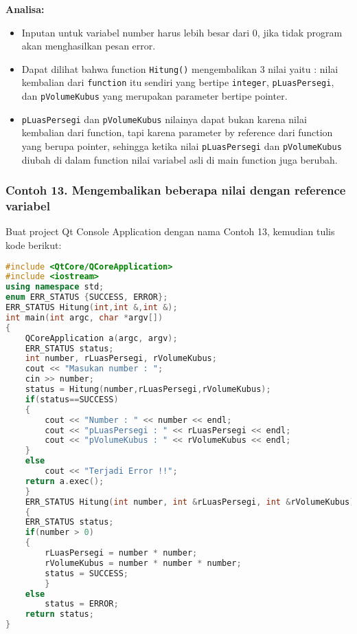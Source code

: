\textbf{Analisa:}

\begin{itemize}
\tightlist
\item
  Inputan untuk variabel number harus lebih besar dari 0, jika tidak
  program akan menghasilkan pesan error.
\item
  Dapat dilihat bahwa function \texttt{Hitung()} mengembalikan 3 nilai
  yaitu : nilai kembalian dari \texttt{function} itu sendiri yang
  bertipe \texttt{integer}, \texttt{pLuasPersegi}, dan
  \texttt{pVolumeKubus} yang merupakan parameter bertipe pointer.
\item
  \texttt{pLuasPersegi} dan \texttt{pVolumeKubus} nilainya dapat bukan
  karena nilai kembalian dari function, tapi karena parameter by
  reference dari function yang berupa pointer, sehingga ketika nilai
  \texttt{pLuasPersegi} dan \texttt{pVolumeKubus} diubah di dalam
  function nilai variabel asli di main function juga berubah.
\end{itemize}

\subsubsection*{Contoh 13. Mengembalikan beberapa nilai dengan reference variabel}

Buat project Qt Console Application dengan nama Contoh 13, kemudian
tulis kode berikut:

\begin{lstlisting}[language=c++]
#include <QtCore/QCoreApplication>
#include <iostream>
using namespace std;
enum ERR_STATUS {SUCCESS, ERROR};
ERR_STATUS Hitung(int,int &,int &);
int main(int argc, char *argv[])
{
    QCoreApplication a(argc, argv);
    ERR_STATUS status;
    int number, rLuasPersegi, rVolumeKubus;
    cout << "Masukan number : ";
    cin >> number;
    status = Hitung(number,rLuasPersegi,rVolumeKubus);
    if(status==SUCCESS)
    {
        cout << "Number : " << number << endl;
        cout << "pLuasPersegi : " << rLuasPersegi << endl;
        cout << "pVolumeKubus : " << rVolumeKubus << endl;
    }
    else
        cout << "Terjadi Error !!";
    return a.exec();
    }
    ERR_STATUS Hitung(int number, int &rLuasPersegi, int &rVolumeKubus)
    {
    ERR_STATUS status;
    if(number > 0)
    {
        rLuasPersegi = number * number;
        rVolumeKubus = number * number * number;
        status = SUCCESS;
        }
    else
        status = ERROR;
    return status;
}
\end{lstlisting}

